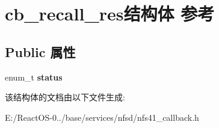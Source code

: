 \hypertarget{structcb__recall__res}{}\section{cb\+\_\+recall\+\_\+res结构体 参考}
\label{structcb__recall__res}
\subsection*{Public 属性}
\begin{DoxyCompactItemize}
\item 
\mbox{\label{structcb__recall__res_a535bf8c95f0a38a338bd7efd5c280508}} 
enum\+\_\+t {\bfseries status}
\end{DoxyCompactItemize}


该结构体的文档由以下文件生成\+:\begin{DoxyCompactItemize}
\item 
E\+:/\+React\+O\+S-\/0../base/services/nfsd/nfs41\+\_\+callback.\+h\end{DoxyCompactItemize}
